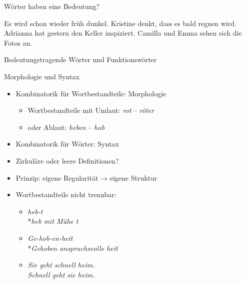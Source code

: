 \begin{frame}
  {Wörter haben eine Bedeutung?}
  \pause
  \begin{exe}
    \ex \alert{Es} \alert{wird} schon wieder früh dunkel.
    \pause
    \ex Kristine denkt, \alert{dass} \alert{es} bald regnen \alert{wird}.
    \pause
    \ex Adrianna \alert{hat} gestern \alert{den} Keller inspiziert.
    \pause
    \ex Camilla \alert{und} Emma sehen \alert{sich} \alert{die} Fotos \alert{an}.
  \end{exe}
  \Zeile
  \pause
  \large
  Bedeutungstragende Wörter und \alert{Funktionswörter}
\end{frame}

\begin{frame}
  {Morphologie und Syntax}
  \pause
  \begin{itemize}[<+->]
    \item Kombinatorik für \alert{Wortbestandteile}: Morphologie
      \begin{itemize}[<+->]
        \item Wortbestandteile \zB mit \alert{Umlaut}: \textit{rot} -- \textit{röter}
        \item oder \alert{Ablaut}: \textit{heben} -- \textit{hob}
      \end{itemize}
    \item Kombinatorik für \alert{Wörter}: Syntax
      \Zeile
    \item \alert{Zirkuläre oder leere Definitionen?}
    \item {} Prinzip: eigene Regularität → eigene Struktur
      \Zeile
    \item Wortbestandteile \alert{nicht trennbar}:
      \begin{itemize}
        \item \textit{heb-t}\\
          *\textit{heb mit Mühe t}
        \item \textit{Ge-hob-en-heit} \\
          *\textit{Gehoben anspruchsvolle heit}
        \item \textit{Sie geht schnell heim.}\\
          \textit{Schnell geht sie heim.}
      \end{itemize}
  \end{itemize}
\end{frame}

